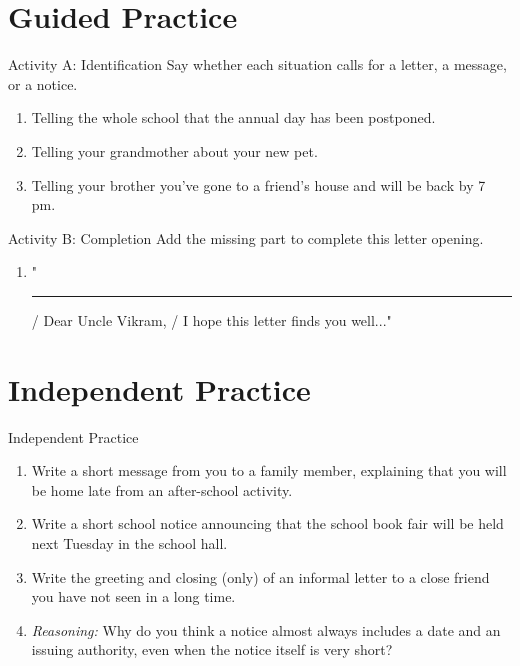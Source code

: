 \section{Guided Practice}
\begin{activitybox}{Activity A: Identification}
Say whether each situation calls for a letter, a message, or a notice.
\begin{enumerate}
    \item Telling the whole school that the annual day has been postponed.
    \item Telling your grandmother about your new pet.
    \item Telling your brother you've gone to a friend's house and will be back by 7 pm.
\end{enumerate}
\end{activitybox}

\begin{activitybox}{Activity B: Completion}
Add the missing part to complete this letter opening.
\begin{enumerate}
    \item "\rule{5cm}{0.4pt} / Dear Uncle Vikram, / I hope this letter finds you well..."
\end{enumerate}
\end{activitybox}

\section{Independent Practice}
\begin{activitybox}{Independent Practice}
\begin{enumerate}
    \item Write a short message from you to a family member, explaining that you will be home late from an after-school activity.
    \item Write a short school notice announcing that the school book fair will be held next Tuesday in the school hall.
    \item Write the greeting and closing (only) of an informal letter to a close friend you have not seen in a long time.
    \item \textit{Reasoning:} Why do you think a notice almost always includes a date and an issuing authority, even when the notice itself is very short?
\end{enumerate}
\end{activitybox}

